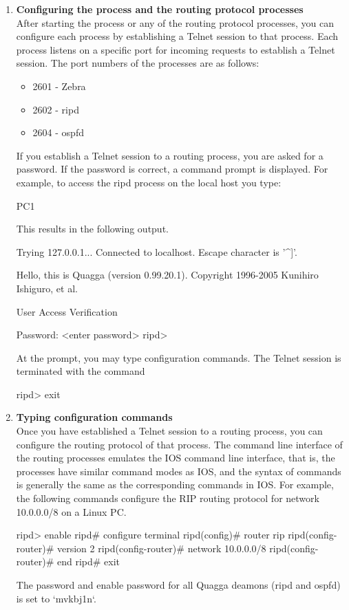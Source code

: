 \begin{enumerate}[label=\textbf{(\alph*)},labelindent=0em]
	\item \textbf{Configuring the  process and the routing protocol processes}\hfill \\
		After starting the  process or any of the routing protocol processes, you can configure each process by establishing a Telnet session to that process. Each process listens on a specific port for incoming requests to establish a Telnet session. The port numbers of the processes are as follows:
		\begin{itemize}
			\item 2601 - Zebra
			\item 2602 - ripd
			\item 2604 - ospfd
		\end{itemize}
		If you establish a Telnet session to a routing process, you are asked for a password. If the password is correct, a command prompt is displayed. For example, to access the ripd process on the local host you type:
		\begin{cmdblock}
	PC1%
		\end{cmdblock}
		This results in the following output.
		\begin{cmdblock}
	Trying 127.0.0.1...
	Connected to localhost.
	Escape character is '^]'.
	
	Hello, this is Quagga (version 0.99.20.1).
	Copyright 1996-2005 Kunihiro Ishiguro, et al.
	
	
	User Access Verification
	
	Password: <enter password>
	ripd>
		\end{cmdblock}
		At the prompt, you may type configuration commands. The Telnet session is terminated with the command
		\begin{cmdblock}
	ripd> exit
		\end{cmdblock}
	\item \textbf{Typing configuration commands}\hfill \\
		Once you have established a Telnet session to a routing process, you can configure the routing protocol of that process. The command line interface of the routing processes emulates the IOS command line interface, that is, the processes have similar command modes as IOS, and the syntax of commands is generally the same as the corresponding commands in IOS.
For example, the following commands configure the RIP routing protocol for network 10.0.0.0/8 on a Linux PC.
		\begin{cmdblock}
	ripd> enable
	ripd# configure terminal
	ripd(config)# router rip 
	ripd(config-router)# version 2 
	ripd(config-router)# network 10.0.0.0/8 
	ripd(config-router)# end
	ripd# exit
		\end{cmdblock}
		The password and enable password for all Quagga deamons (ripd and ospfd) is set to `mvkbj1n`.
\end{enumerate}

